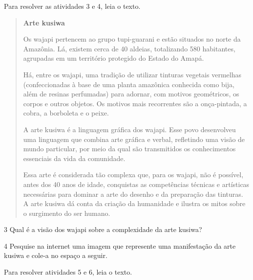 Para resolver as atividades 3 e 4, leia o texto.

\begin{quote}
\textbf{Arte kusiwa}

Os wajapi pertencem ao grupo tupi-guarani e estão situados no norte da
Amazônia. Lá, existem cerca de 40 aldeias, totalizando 580 habitantes,
agrupadas em um território protegido do Estado do Amapá.

Há, entre os wajapi, uma tradição de utilizar tinturas vegetais vermelhas
(confeccionadas à base de uma planta amazônica conhecida como bija, além
de resinas perfumadas) para adornar, com motivos geométricos, os corpos e
outros objetos. Os motivos mais recorrentes são a onça-pintada, a cobra, a
borboleta e o peixe.

A arte kusiwa é a linguagem gráfica dos wajapi. Esse povo
desenvolveu uma linguagem que combina arte gráfica e verbal, refletindo uma
visão de mundo particular, por meio da qual são transmitidos os conhecimentos
essenciais da vida da comunidade.

Essa arte é considerada tão complexa que, para os wajapi, não é possível, antes
dos 40 anos de idade, conquistas as competências técnicas e artísticas necessárias
para dominar a arte do desenho e da preparação das tinturas. A arte kusiwa dá conta
da criação da humanidade e ilustra os mitos sobre o surgimento do ser humano.

\end{quote}


\num{3}  Qual é a visão dos wajapi sobre a complexidade da arte kusiwa?



\num{4}  Pesquise na internet uma imagem que represente uma manifestação da
arte kusiwa e cole-a no espaço a seguir.




Para resolver atividades 5 e 6, leia o texto.

